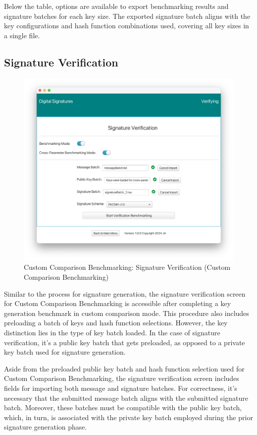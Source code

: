 \documentclass[]{final_report}
\begin{document}
Below the table, options are available to export benchmarking results and signature batches for each key size. The exported signature batch aligns with the key configurations and hash function combinations used, covering all key sizes in a single file.


\subsection{Signature Verification}

\begin{figure}[H]
    \centering
    \includegraphics[scale= 0.4]{main_pictures/ui/custom10.png}
   \caption{Custom Comparison Benchmarking: Signature Verification (Custom Comparison Benchmarking)}
\end{figure}

Similar to the process for signature generation, the signature verification screen for Custom Comparison Benchmarking is accessible after completing a key generation benchmark in custom comparison mode. This procedure also includes preloading a batch of keys and hash function selections. However, the key distinction lies in the type of key batch loaded. In the case of signature verification, it's a public key batch that gets preloaded, as opposed to a private key batch used for signature generation.

Aside from the preloaded public key batch and hash function selection used for Custom Comparison Benchmarking, the signature verification screen includes fields for importing both message and signature batches. For correctness, it's necessary that the submitted message batch aligns with the submitted signature batch. Moreover, these batches must be compatible with the public key batch, which, in turn, is associated with the private key batch employed during the prior signature generation phase.
\end{document}
